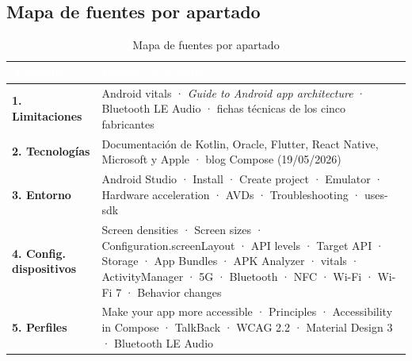 \subsection*{Mapa de fuentes por apartado}

{\small
\begin{table}[htbp]
\centering
\begin{tabularx}{\textwidth}{@{}>{\RaggedRight\arraybackslash}p{3.5cm} >{\RaggedRight\arraybackslash}X@{}}
\toprule
\rowcolor{primary}
\textcolor{white}{\sffamily\bfseries Apartado} & \textcolor{white}{\sffamily\bfseries Fuentes principales} \\
\midrule
\textbf{1. Limitaciones} & Android vitals · \emph{Guide to Android app architecture} · Bluetooth LE Audio · fichas técnicas de los cinco fabricantes \\
\rowcolor{soft}
\textbf{2. Tecnologías} & Documentación de Kotlin, Oracle, Flutter, React Native, Microsoft y Apple · blog Compose (19/05/2026) \\
\textbf{3. Entorno} & Android Studio · Install · Create project · Emulator · Hardware acceleration · AVDs · Troubleshooting · uses-sdk \\
\rowcolor{soft}
\textbf{4. Config. dispositivos} & Screen densities · Screen sizes · Configuration.screenLayout · API levels · Target API · Storage · App Bundles · APK Analyzer · vitals · ActivityManager · 5G · Bluetooth · NFC · Wi-Fi · Wi-Fi 7 · Behavior changes \\
\textbf{5. Perfiles} & Make your app more accessible · Principles · Accessibility in Compose · TalkBack · WCAG 2.2 · Material Design 3 · Bluetooth LE Audio \\
\bottomrule
\end{tabularx}
\caption{Mapa de fuentes por apartado}
\end{table}
}


